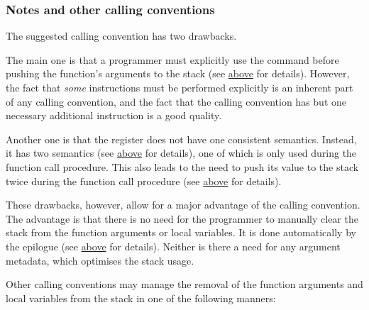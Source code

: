 \subsubsection{Notes and other calling conventions}

\vspace{-0.2cm}

The suggested calling convention has two drawbacks.

The main one is that a programmer must explicitly use the  command
before pushing the function's arguments to the stack
(see \hyperlink{functions:cmd:prc}{above} for details).
However, the fact that \textit{some} instructions must be performed explicitly
is an inherent part of any calling convention, and the fact that the 
calling convention has but one necessary additional instruction is a good
quality.

Another one is that the  register does not have one consistent
semantics.
Instead, it has two semantics (see \hyperlink{r13}{above} for details),
one of which is only used during the function call procedure.
This also leads to the need to push its value to the stack twice
during the function call procedure (see
\hyperlink{functions:call}{above} for details).

These drawbacks, however, allow for a major advantage of the  calling
convention.
The advantage is that there is no need for the programmer to manually clear
the stack from the function arguments or local variables.
It is done automatically by the epilogue
(see \hyperlink{functions:return}{above} for details).
Neither is there a need for any argument metadata, which optimises the stack
usage.

Other calling conventions may manage the removal of the function arguments
and local variables from the stack in one of the following manners:

